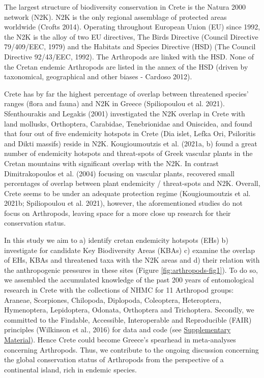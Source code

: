 The largest structure of biodiversity conservation in Crete is the Natura 2000
network (N2K). N2K is the only regional assemblage of protected areas
worldwide (Crofts 2014). Operating throughout European Union (EU) since 1992,
the N2K is the alloy of two EU directives, The Birds Directive (Council Directive 79/409/EEC, 1979)
and the Habitats and Species Directive (HSD) (The Council Directive 92/43/EEC, 1992).
The Arthropods are linked with the HSD. None of the Cretan endemic Arthropods
are listed in the annex of the HSD (driven by taxonomical, geographical and
other biases - Cardoso 2012).

Crete has by far the highest percentage of overlap between threatened species’
ranges (flora and fauna) and N2K in Greece (Spiliopoulou et al. 2021).
Sfenthourakis and Legakis (2001) investigated the N2K overlap in Crete with
land mollusks, Orthoptera, Carabidae, Tenebrionidae and Oniscidea, and found
that four out of five endemicity hotspots in Crete (Dia islet, Lefka Ori,
Psiloritis and Dikti massifs) reside in N2K. Kougioumoutzis et al. (2021a, b)
found a great number of endemicity hotspots and threat-spots of Greek vascular
plants in the Cretan mountains with significant overlap with the N2K.
In contrast Dimitrakopoulos et al. (2004) focusing on vascular plants,
recovered small percentages of overlap between plant endemicity / threat-spots and N2K.
Overall, Crete seems to be under an adequate protection regime (Kougioumoutzis et al. 2021b; Spiliopoulou et al. 2021),
however, the aforementioned studies do not focus on Arthropods, leaving space
for a more close up research for their conservation status.

In this study we aim to a) identify cretan endemicity hotspots (EHs)
b) investigate for candidate Key Biodiversity Areas (KBAs)
c) examine the overlap of EHs, KBAs and threatened taxa with the N2K areas and
d) their relation with the anthropogenic pressures in these sites (Figure \ref{fig:arthropods-fig1}).
To do so, we assembled the accumulated knowledge of the past 200 years of
entomological research in Crete with the collections of NHMC for 11 Arthropod groups:
Araneae, Scorpiones, Chilopoda, Diplopoda, Coleoptera, Heteroptera,
Hymenoptera, Lepidoptera, Odonata, Orthoptera and Trichoptera.
Secondly, we committed to the Findable, Accessible, Interoperable and Reproducible (FAIR) principles (Wilkinson et al., 2016)
for data and code (see \href{https://doi.org/10.5281/zenodo.10635645}{Supplementary Material}). Hence Crete could become Greece’s
spearhead in meta-analyses concerning Arthropods. Thus, we contribute to the
ongoing discussion concerning the global conservation status of Arthropods from
the perspective of a continental island, rich in endemic species.

